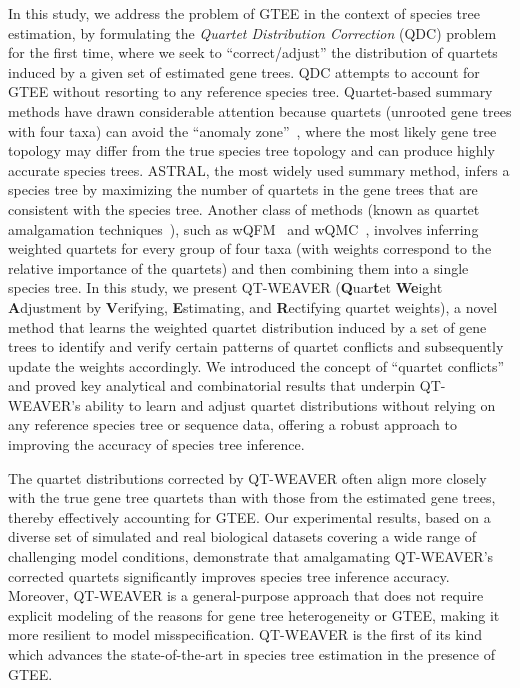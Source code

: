 \documentclass[10pt,a4paper]{article}
\newcommand{\add}[1]{{\color{blue} #1}}
\begin{document}

In this study, we address the problem of GTEE in the context of species tree estimation, by formulating the \textit{Quartet Distribution Correction} (QDC) problem for the first time, where we seek to ``correct/adjust'' the distribution of quartets induced by a given set of estimated gene trees. QDC attempts to account for GTEE without resorting to any reference species tree. %
Quartet-based summary methods have drawn considerable attention because quartets (unrooted gene trees with four taxa) can avoid the ``anomaly zone''~\cite{DR06,DR09,degnan2013anomalous}, where the most likely gene tree topology may differ from the true species tree topology and can produce highly accurate species trees. ASTRAL, the most widely used summary method, infers a species tree by maximizing the number of quartets in the gene trees that are consistent with the species tree. Another class of methods (known as quartet amalgamation techniques~\cite{snir_quartets_2008,qfm,qfm-fi,wqfm,wqmc}), such as wQFM~\cite{wqfm} and wQMC~\cite{wqmc}, involves inferring weighted quartets for every group of four taxa (with weights correspond to the relative importance of the quartets) and then combining them into a single species tree. In this study, we present QT-WEAVER (\textbf{Q}uar\textbf{t}et \textbf{We}ight \textbf{A}djustment by \textbf{V}erifying, \textbf{E}stimating, and \textbf{R}ectifying quartet weights), a novel method that learns the weighted quartet distribution induced by a set of gene trees to identify and verify certain patterns of quartet conflicts and subsequently update the weights accordingly. We introduced the concept of ``quartet conflicts'' and proved key analytical and combinatorial results that underpin QT-WEAVER's ability to learn and adjust quartet distributions without relying on any reference species tree or sequence data, offering a robust approach to improving the accuracy of species tree inference. 

The quartet distributions corrected by QT-WEAVER often align more closely with the true gene tree quartets than with those from the estimated gene trees, thereby effectively accounting for GTEE. Our experimental results, based on a diverse set of simulated and real biological datasets covering a wide range of challenging model conditions, demonstrate that amalgamating QT-WEAVER's corrected quartets significantly improves species tree inference accuracy. Moreover, QT-WEAVER is a general-purpose approach that does not require explicit modeling of the reasons for gene tree heterogeneity or GTEE, making it more resilient to model misspecification. QT-WEAVER is the first of its kind which advances the state-of-the-art in species tree estimation in the presence of GTEE.
\end{document}

